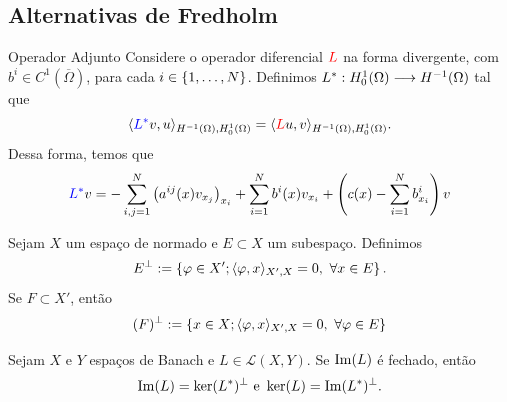\subsection*{Alternativas de Fredholm}
\begin{frame}{Operador Adjunto}
Considere o operador diferencial \({\color{red}L}\) na forma divergente, com 
\(b^i\in C^1(\overline{\Omega})\), para cada \(i\in \{1,\ldots,N\}\).
Definimos \(L^\ast : H_0^1(\Omega)\longrightarrow H^{-1}(\Omega)\) tal que
\[
\langle{\color{blue}L^\ast} v,u\rangle_{H^{-1}(\Omega),H_0^1(\Omega)}=\langle{\color{red}L}u,v\rangle_{H^{-1}(\Omega),H_0^1(\Omega)}.
\]
Dessa forma, temos que
\[
{\color{blue}L^\ast}v
=-\sum_{i,j=1}^{N}\left(a^{ij}(x)v_{x_j}\right)_{x_i}+\sum_{i=1}^{N}b^i(x)v_{x_i}+\left(c(x)-\sum_{i=1}^{N}b^i_{x_i}\right)v
\]
\end{frame}
\begin{frame}{ }
\begin{defin}
Sejam \(X\) um espaço de normado e \(E\subset X\) um subespaço. Definimos
\[
E^\perp:=\left\{\varphi\in X';\langle\varphi,x\rangle_{X',X}=0,\ \forall x\in E\right\}.
\]
Se \(F\subset X'\), então
\[
(F)^\perp:=\left\{x\in X;\langle\varphi,x\rangle_{X',X}=0,\ \forall \varphi\in E\right\}
\]
\end{defin}
\begin{prop}
Sejam \(X\) e \(Y\) espaços de Banach e \(L\in \mathcal{L}(X,Y)\). Se \(\operatorname{Im}(L)\) é fechado, então
\[
\operatorname{Im}(L)=\ker(L^\ast)^\perp \text{ e } \ker(L)=\operatorname{Im} (L^\ast)^\perp.
\]
\end{prop}
\end{frame}

